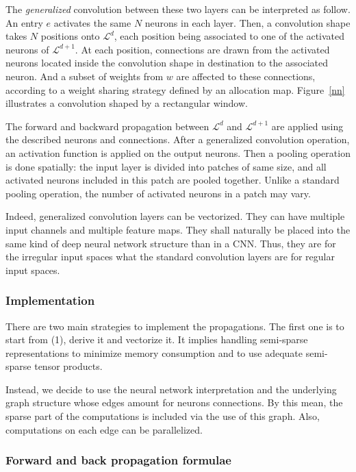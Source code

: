 The \textit{generalized} convolution between these two layers can be interpreted as follow. An entry $e$ activates the same $N$ neurons in each layer. Then, a convolution shape takes $N$ positions onto $\mathcal{L}^d$, each position being associated to one of the activated neurons of $\mathcal{L}^{d+1}$. At each position, connections are drawn from the activated neurons located inside the convolution shape in destination to the associated neuron. And a subset of weights from $w$ are affected to these connections, according to a weight sharing strategy defined by an allocation map. Figure~\ref{nn} illustrates a convolution shaped by a rectangular window.

The forward and backward propagation between $\mathcal{L}^d$ and $\mathcal{L}^{d+1}$  are applied using the described neurons and connections. After a generalized convolution operation, an activation function is applied on the output neurons. Then a pooling operation is done spatially: the input layer is divided into patches of same size, and all activated neurons included in this patch are pooled together. Unlike a standard pooling operation, the number of activated neurons in a patch may vary.

Indeed, generalized convolution layers can be vectorized. They can have multiple input channels and multiple feature maps. They shall naturally be placed into the same kind of deep neural network structure than in a CNN. Thus, they are for the irregular input spaces what the standard convolution layers are for regular input spaces.

  \subsubsection{Implementation}

There are two main strategies to implement the propagations. The first one is to start from (1), derive it and vectorize it. It implies handling semi-sparse representations to minimize memory consumption and to use adequate semi-sparse tensor products.

Instead, we decide to use the neural network interpretation and the underlying graph structure whose edges amount for neurons connections. By this mean, the sparse part of the computations is included via the use of this graph. Also, computations on each edge can be parallelized.

  \subsubsection{Forward and back propagation formulae}
  \label{formulae}

